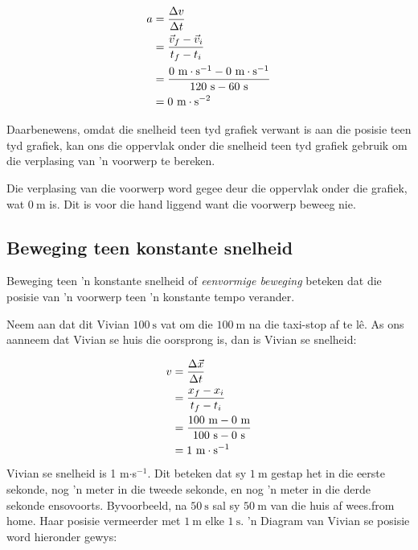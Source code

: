     \begin{align*}
    a &= \frac{\Delta v}{\Delta t}\hfill \\ 
    &= \frac{\vec{v}_{f}-\vec{v}_{i}}{{t}_{f}-{t}_{i}}\hfill \\ 
    &= \frac{0~\text{m}\cdot\text{s}^{-1}-0~\text{m}\cdot\text{s}^{-1}}{120~\text{s}-60~\text{s}}\\ 
    &= 0~\text{m}\cdot\text{s}^{-2}
      \end{align*}

Daarbenewens, omdat die snelheid teen tyd grafiek verwant is aan die posisie teen tyd grafiek, kan ons die oppervlak onder die snelheid teen tyd grafiek gebruik om die verplasing van  'n voorwerp te bereken.\par 

	\par

Die verplasing van die voorwerp word gegee deur die oppervlak onder die grafiek, wat $0~\text{m}$ is. Dit is voor die hand liggend want die voorwerp beweeg nie.\par 


\subsection*{Beweging teen konstante snelheid}
\nopagebreak
Beweging teen  'n konstante snelheid of \textsl{eenvormige beweging} beteken dat die posisie van  'n voorwerp teen  'n konstante tempo verander.\par 
Neem aan dat dit Vivian $100~\text{s}$ vat om die $100~\text{m}$ na die taxi-stop af te l\^e. As ons aanneem dat Vivian se huis die oorsprong is, dan is Vivian se snelheid:\par 
        \label{m38795*id69850}\nopagebreak\noindent{}
          
    \begin{align*}
    	v&= \frac{\Delta \vec{x}}{\Delta t}\hfill \\ 
	&= \frac{{x}_{f}-{x}_{i}}{{t}_{f}-{t}_{i}}\hfill \\ 
	&= \frac{100~\text{m}-0~\text{m}}{100~\text{s}-0~\text{s}}\\ 
	 &= 1~\text{m}\cdot{\text{s}}^{-1}
      \end{align*}
Vivian se snelheid is 1 m$\ensuremath{\cdot}$s${}^{-1}$. Dit beteken dat sy $1~\text{m}$ gestap het in die eerste sekonde, nog  'n meter in die tweede sekonde, en nog  'n meter in die derde sekonde ensovoorts. Byvoorbeeld, na $50~\text{s}$ sal sy $50~\text{m}$ van die huis af wees.from home. Haar posisie vermeerder met $1~\text{m}$ elke $1~\text{s}$.  'n Diagram van Vivian se posisie word hieronder gewys:\par 

